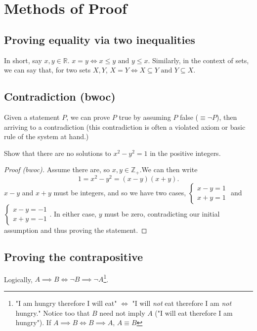 \documentclass[12pt,oneside]{article}
\begin{document}
\section{Methods of Proof}
\subsection{Proving equality via two inequalities}
In short, say $x, y \in \mathbb{R}$. $x = y \iff x \leq y \text{ and } y \leq x$. Similarly, in the context of sets, we can say that, for two sets $X, Y$, $X = Y \iff X \subseteq Y \text{ and } Y \subseteq X$.

\subsection{Contradiction (bwoc)}

Given a statement $P$, we can prove $P$ true by assuming $P$ false ($\equiv \neg P$), then arriving to a contradiction (this contradiction is often a violated axiom or basic rule of the system at hand.)
\begin{example}
Show that there are no solutions to $x^2 - y^2 = 1$ in the positive integers.
\begin{proof}[Proof (bwoc)] Assume there are, so $x, y \in \mathbb{Z}_+$.\footnotemark We can then write \[1 = x^2 - y^2 = (x-y)(x+y).\] $x-y$ and $x+y$ must be integers, and so we have two cases, $\begin{cases}
  x-y = 1\\
  x+y = 1
\end{cases}$ and $\begin{cases}
  x-y = -1\\
  x+y = -1
\end{cases}$. In either case, $y$ must be zero, contradicting our initial assumption and thus proving the statement.
\end{proof}
\end{example}


\subsection{Proving the contrapositive}
Logically, $A \implies B \iff \neg B \implies \neg A$\footnote{"I am hungry therefore I will eat" $\iff$ "I will \textit{not} eat therefore I am \textit{not} hungry." Notice too that $B$ need not imply $A$ ("I will eat therefore I am hungry"). If $A \implies B \iff B \implies A$, $A \equiv B$}.
\end{document}
